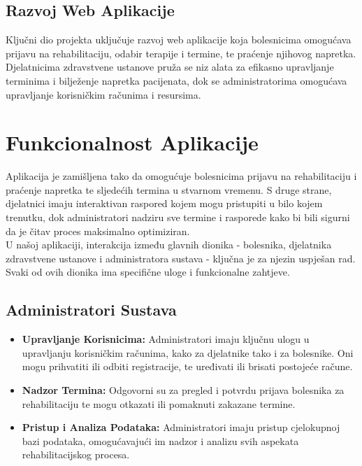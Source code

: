        \subsection*{\textbf{\large Razvoj Web Aplikacije}}
        Ključni dio projekta uključuje razvoj web aplikacije koja bolesnicima omogućava prijavu na rehabilitaciju, odabir terapije i termine, te praćenje njihovog napretka. Djelatnicima zdravstvene ustanove pruža se niz alata za efikasno upravljanje terminima i bilježenje napretka pacijenata, dok se administratorima omogućava upravljanje korisničkim računima i resursima.


        \section*{Funkcionalnost Aplikacije}

        Aplikacija je zamišljena tako da omogućuje bolesnicima prijavu na rehabilitaciju i praćenje napretka te sljedećih termina u stvarnom vremenu. S druge strane, djelatnici imaju interaktivan raspored kojem mogu pristupiti u bilo kojem trenutku, dok administratori nadziru sve termine i rasporede kako bi bili sigurni da je čitav proces maksimalno optimiziran. \\
        
        U našoj aplikaciji, interakcija između glavnih dionika - bolesnika, djelatnika zdravstvene ustanove i administratora sustava - ključna je za njezin uspješan rad. Svaki od ovih dionika ima specifične uloge i funkcionalne zahtjeve.
        
        \subsection*{Administratori Sustava}
        \begin{itemize}
            \item \textbf{Upravljanje Korisnicima:} Administratori imaju ključnu ulogu u upravljanju korisničkim računima, kako za djelatnike tako i za bolesnike. Oni mogu prihvatiti ili odbiti registracije, te uređivati ili brisati postojeće račune.
            
            \item \textbf{Nadzor Termina:} Odgovorni su za pregled i potvrdu prijava bolesnika za rehabilitaciju te mogu otkazati ili pomaknuti zakazane termine.
        
            \item \textbf{Pristup i Analiza Podataka:} Administratori imaju pristup cjelokupnoj bazi podataka, omogućavajući im nadzor i analizu svih aspekata rehabilitacijskog procesa.
        \end{itemize}
        
